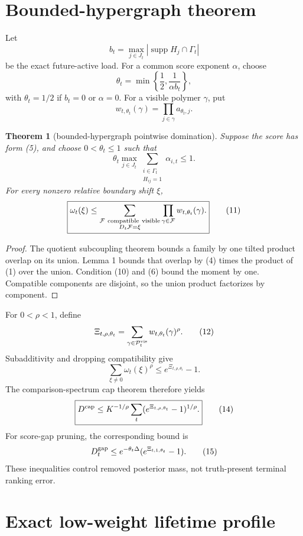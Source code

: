 \documentclass[11pt]{article}
\newtheorem{theorem}{Theorem}
\newcommand{\1}{\mathbf 1}
\begin{document}
\section{Bounded-hypergraph theorem}

Let
\[
 b_t
 =
 \max_{j\in J_t}
 |\operatorname{supp}H_j\cap\Gamma_t|
\tag{7}
\]
be the exact future-active load.  For a common score exponent \(\alpha\),
choose
\[
 \theta_t
 =
 \min\left\{\frac12,\frac{1}{\alpha b_t}\right\},
\tag{8}
\]
with \(\theta_t=1/2\) if \(b_t=0\) or \(\alpha=0\).  For a visible polymer
\(\gamma\), put
\[
 w_{t,\theta_t}(\gamma)
 =
 \prod_{j\in\gamma}a_{\theta_t,j}.
\tag{9}
\]

\begin{theorem}[bounded-hypergraph pointwise domination]
Suppose the score has form (5), and choose \(0<\theta_t\le1\) such that
\[
 \theta_t
 \max_{j\in J_t}
 \sum_{\substack{i\in\Gamma_t\\H_{ij}=1}}\alpha_{i,t}
 \le1.
\tag{10}
\]
For every nonzero relative boundary shift \(\xi\),
\[
\boxed{
 \omega_t(\xi)
 \le
 \sum_{\substack{
 \mathcal F\ {\rm compatible\ visible}\\
 D_t\mathcal F=\xi}}
 \prod_{\gamma\in\mathcal F}w_{t,\theta_t}(\gamma).}
\tag{11}
\]
\end{theorem}

\begin{proof}
The quotient subcoupling theorem bounds a family by one tilted product
overlap on its union.  Lemma 1 bounds that overlap by (4) times the product
of (1) over the union.  Condition (10) and (6) bound the moment by one.
Compatible components are disjoint, so the union product factorizes by
component.
\end{proof}

For \(0<\rho<1\), define
\[
 \Xi_{t,\rho,\theta_t}
 =
 \sum_{\gamma\in\mathcal P_t^{\rm vis}}
 w_{t,\theta_t}(\gamma)^\rho.
\tag{12}
\]
Subadditivity and dropping compatibility give
\[
 \sum_{\xi\ne0}\omega_t(\xi)^\rho
 \le e^{\Xi_{t,\rho,\theta_t}}-1.
\tag{13}
\]
The comparison-spectrum cap theorem therefore yields
\[
\boxed{
 D^{\rm cap}
 \le
 K^{-1/\rho}\sum_t
 (e^{\Xi_{t,\rho,\theta_t}}-1)^{1/\rho}.}
\tag{14}
\]
For score-gap pruning, the corresponding bound is
\[
 D_t^{\rm gap}
 \le
 e^{-\theta_t\Delta}
 (e^{\Xi_{t,1,\theta_t}}-1).
\tag{15}
\]
These inequalities control removed posterior mass, not truth-present
terminal ranking error.

\section{Exact low-weight lifetime profile}
\end{document}
